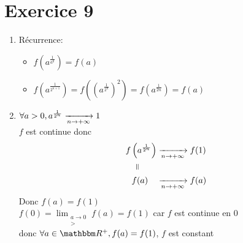 \part{Exercice 9}

\begin{enumerate}
	\item Récurrence:
		\begin{itemize}
			\item $f\left( a^{\frac{1}{a^0}} \right) = f(a)$ 
			\item $f\left( a^{\frac{1}{2^{n+1}}} \right) = f\left( \left( a^{\frac{1}{2^{n}}} \right)^2 \right) = f\left(a^{\frac{1}{2n}} \right) = f(a) $
		\end{itemize}
	\item $\forall a > 0, a^{\frac{1}{2^n}} \xrightarrow[n \to +\infty]{} 1$\\
		$f$ est continue donc
		\begin{align*}
			f\left( a^{\frac{1}{2^n}} \right)& \tendsto{n \to +\infty} f(1)\\
			\vrt{=}\qquad&\\
			f(a)\quad& \tendsto{n \to +\infty} f(a)
		\end{align*}
		Donc $f(a) = f(1)$\\
		$f(0) = \lim_{\substack{a\to 0\\>}} f(a) = f(1)$ car $f$ est continue en $0$ \\
		donc $\forall a \in \R^+, f(a) = f(1)$, $f$ est constant
\end{enumerate}
